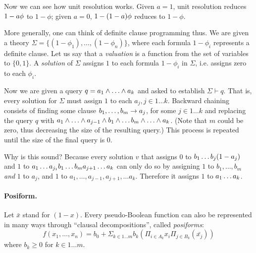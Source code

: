 \documentclass{article} %
\begin{document}
Now we can see how unit resolution works.  Given $a=1$, unit resolution reduces $1-a\phi$ to $1-\phi$; given $a=0$, $1- (1-a) \phi$ reduces to $1-\phi$. 

More generally, one can think of definite clause programming thus. We are given a theory $\Sigma=\{(1-\phi_1),\ldots, (1-\phi_n)\}$, where each formula $1-\phi_i$ represents a definite clause.  
Let us say that a {\em valuation} is a function from the set of variables to $\{0,1\}$. A {\em solution} of $\Sigma$ assigns $1$ to each formula $1-\phi_i$ in $\Sigma$, i.e.{} assigns zero to each $\phi_i$. 

Now we are given a query $q=a_1 \wedge \ldots \wedge a_k$ and asked to establish $\Sigma \vdash q$. That is, every solution for $\Sigma$ must assign $1$ to each $a_j, j\in 1\ldots k$. Backward chaining consists of finding some clause $b_1,\ldots, b_m\rightarrow a_j$, for some $j\in 1\ldots k$ and replacing the query $q$ with $a_1\wedge \ldots \wedge a_{j-1} \wedge b_1 \wedge \ldots b_m \wedge \ldots \wedge a_k$. (Note that $m$ could be zero, thus decreasing the size of the resulting query.) This process is repeated until the size of the final query is $0$.

Why is this sound? Because every solution $v$ that assigns $0$ to $b_1 \ldots  b_j (1-a_j)$ and $1$ to 
$a_1 \ldots  a_{j_1} b_1  \ldots  b_m  a_{j+1} \ldots  a_k$ can only do so by 
assigning $1$ to $b_1, \ldots, b_m$ {\em and} $1$ to $a_j$, and $1$ to $a_1,\ldots, a_{j-1},a_{j+1},\ldots a_k$. Therefore it assigns $1$ to $a_1  \ldots  a_k$. 

\paragraph{Posiform.}
Let $\bar{x}$ stand for $(1-x)$. Every pseudo-Boolean function can also be represented in many ways through ``clausal decompositions'', called {\em posiforms}:
\begin{equation}
  f(x_1,\ldots, x_n)=b_0 + \Sigma_{k \in 1\ldots m} b_k (\Pi_{i\in A_k} x_i \Pi_{j\in B_k}(\bar{x_j}))
\end{equation}
\noindent where $b_k\geq 0$ for $k \in 1\ldots m$. 


\end{document}
